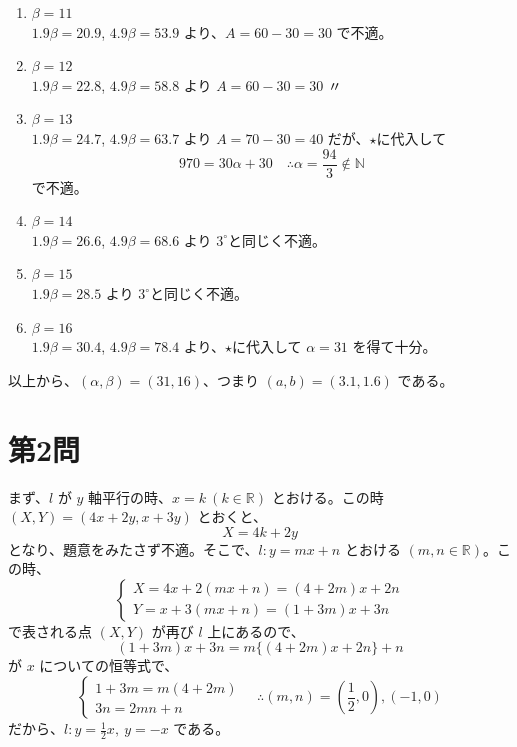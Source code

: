 \documentclass[../main.tex]{subfiles}
\begin{document}
\begin{enumerate}
  \item[$1^\circ$] $\beta = 11$\\
    $1.9\beta = 20.9$, $4.9\beta = 53.9$ より、$A = 60 - 30 = 30$ で不適。

  \item[$2^\circ$] $\beta = 12$\\
    $1.9\beta = 22.8$, $4.9\beta = 58.8$ より $A = 60 - 30 = 30$ 〃

  \item[$3^\circ$] $\beta = 13$\\
    $1.9\beta = 24.7$, $4.9\beta = 63.7$ より $A = 70 - 30 = 40$ だが、$\star$に代入して
    \[
      970 = 30\alpha + 30 \quad \therefore \alpha = \frac{94}{3} \notin \mathbb{N}
    \]
    で不適。

  \item[$4^\circ$] $\beta = 14$\\
    $1.9\beta = 26.6$, $4.9\beta = 68.6$ より $3^\circ$と同じく不適。

  \item[$5^\circ$] $\beta = 15$\\
    $1.9\beta = 28.5$ より $3^\circ$と同じく不適。

  \item[$6^\circ$] $\beta = 16$\\
    $1.9\beta = 30.4$, $4.9\beta = 78.4$ より、$\star$に代入して $\alpha = 31$ を得て十分。
\end{enumerate}
以上から、$(\alpha, \beta) = (31, 16)$、つまり $(a, b) = (3.1, 1.6)$ である。

\newpage

\section*{第2問}

\noindent
[\textbf{解}] まず、$l$ が $y$ 軸平行の時、$x = k\ (k \in \mathbb{R})$ とおける。この時 $(X, Y) = (4x + 2y, x + 3y)$ とおくと、
\[
  X = 4k + 2y
\]
となり、題意をみたさず不適。そこで、$l: y = mx + n$ とおける $(m, n \in \mathbb{R})$。この時、
\[
  \begin{cases}
    X = 4x + 2(mx + n) = (4 + 2m)x + 2n \\
    Y = x + 3(mx + n) = (1 + 3m)x + 3n
  \end{cases}
\]
で表される点 $(X, Y)$ が再び $l$ 上にあるので、
\[
  (1 + 3m)x + 3n = m\{(4 + 2m)x + 2n\} + n
\]
が $x$ についての恒等式で、
\[
  \begin{cases}
    1 + 3m = m(4 + 2m) \\
    3n = 2mn + n
  \end{cases}
  \quad \therefore (m, n) = \left(\frac{1}{2}, 0\right), (-1, 0)
\]
だから、$l: y = \frac{1}{2}x,\ y = -x$ である。
\end{document}

